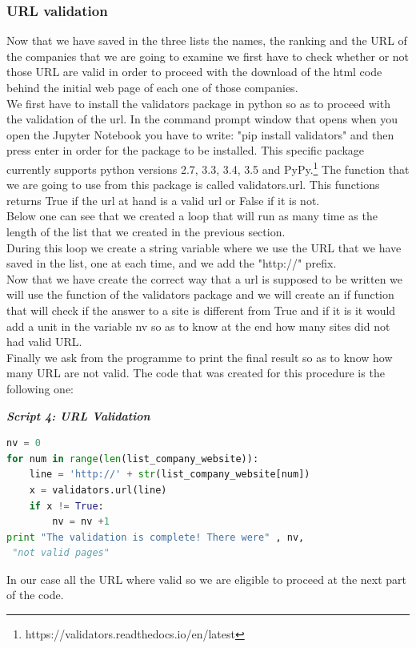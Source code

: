 \documentclass{article}
\begin{document}
\subsubsection{URL validation}
Now that we have saved in the three lists the names, the ranking and the URL of the companies that we are going to examine we first have to check whether or not those URL are valid in order to proceed with the download of the html code behind the initial web page of each one of those companies.\\
We first have to install the validators package in python so as to proceed with the validation of the url. In the command prompt window that opens when you open the Jupyter Notebook you have to write: "pip install validators" and then press enter in order for the package to be installed. This specific package currently supports python versions 2.7, 3.3, 3.4, 3.5 and PyPy.\footnote{https://validators.readthedocs.io/en/latest} 
The function that we are going to use from this package is called validators.url. This functions returns True if the url at hand is a valid url or False if it is not.\\
Below one can see that we created a loop that will run as many time as the length of the list that we created in the previous section.\\
During this loop we create a string variable where we use the URL that we have saved in the list, one at each time, and we add the "http://" prefix.\\
Now that we have create the correct way that a url is supposed to be written we will use the function of the validators package and we will create an if function that will check if the answer to a site is different from True and if it is it would add a unit in the variable nv so as to know at the end how many sites did not had valid URL.\\
Finally we ask from the programme to print the final result so as to know how many URL are not valid. The code that was created for this procedure is the following one:
\begin{center}
\textit{\textbf{Script 4: URL Validation}}
\end{center}
\begin{lstlisting}[language=Python]
nv = 0
for num in range(len(list_company_website)):
    line = 'http://' + str(list_company_website[num])
    x = validators.url(line)    
    if x != True:
        nv = nv +1
print "The validation is complete! There were" , nv,
 "not valid pages"
\end{lstlisting}
In our case all the URL where valid so we are eligible to proceed at the next part of the code.
\end{document}
